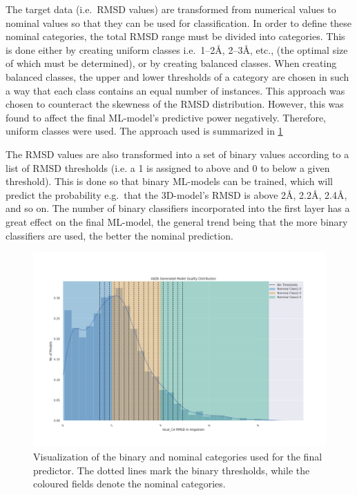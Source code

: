 The target data (i.e.\ RMSD values) are transformed from numerical
values to nominal values so that they can be used for
classification. In order to define these nominal categories, the total
RMSD range must be divided into categories. This is done either by
creating uniform classes i.e.\ 1--2\AA, 2--3\AA, etc., (the optimal size of which
must be determined), or by creating balanced classes. When
creating balanced classes, the upper and lower thresholds of a
category are chosen in such a way that each class contains an equal
number of instances. This approach was chosen to counteract the
skewness of the RMSD distribution. However, this was found to
affect the final ML-model's predictive power negatively. Therefore,
uniform classes were used.
The approach used is summarized in \ref{fig:nominal}

The RMSD values are also transformed into a set of binary values according to a
list of RMSD thresholds (i.e. a 1 is assigned to above and 0 to below a given threshold). This is done so that binary ML-models can be
trained, which will predict the probability e.g.\ that the 3D-model's RMSD
is above 2\AA, 2.2\AA, 2.4\AA, and so on. The number of binary
classifiers incorporated into the first layer has a great effect on
the final ML-model, the general trend being that the more binary
classifiers are used, the better the nominal prediction. 

\begin{figure}
  \centering
  \includegraphics[width=\linewidth]{nominal_classes.png}
  \caption {Visualization of the binary and nominal categories used for the final predictor. The dotted lines mark the binary thresholds, while the coloured fields denote the nominal categories.}
  \label{fig:nominal}
\end{figure}


